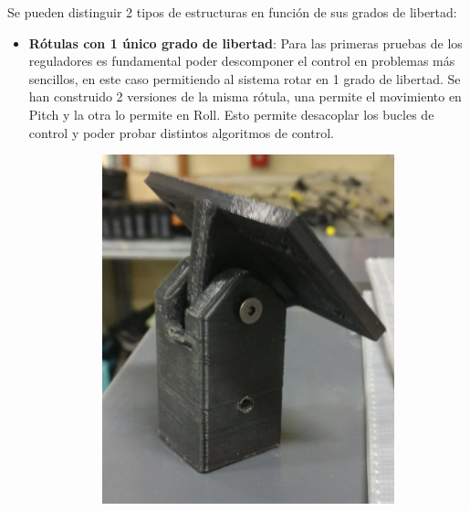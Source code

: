 Se pueden distinguir 2 tipos de estructuras en función de sus grados de libertad:

\begin{itemize}
	\item \textbf{Rótulas con 1 único grado de libertad}: Para las primeras pruebas de los reguladores es fundamental poder descomponer el control en problemas más sencillos, en este caso permitiendo al sistema rotar en 1 grado de libertad. Se han construido 2 versiones de la misma rótula, una permite el movimiento en Pitch y la otra lo permite en Roll. Esto permite desacoplar los bucles de control y poder probar distintos algoritmos de control.
	

\begin{figure}[htb!]
	\centering
	\begin{subfigure}{0.45\textwidth}
		\centering
		\includegraphics[width=\textwidth]{hardware/rotulaPitch1.jpeg}
	\end{subfigure}
	\begin{subfigure}{0.45\textwidth}
		\centering

\end{subfigure}
\end{figure}
\end{itemize}

